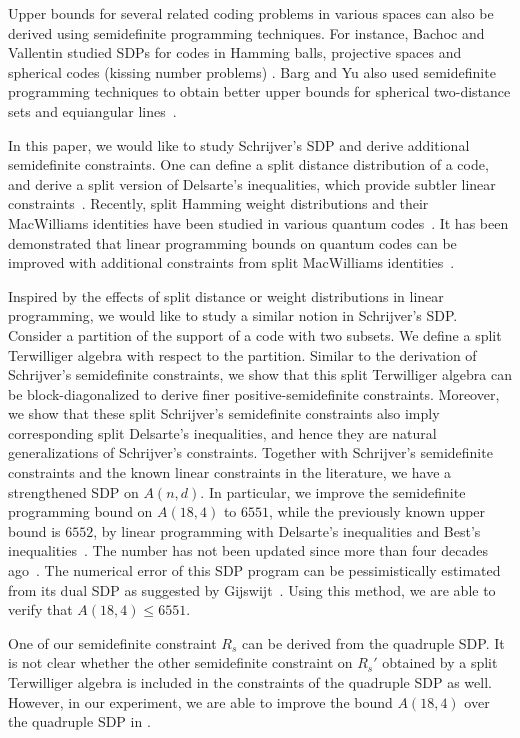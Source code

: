 \documentclass[final,onecolumn]{IEEEtran}
\theoremstyle{definition}
\begin{document}
Upper bounds for several related coding problems in various spaces can also be derived using semidefinite programming techniques. For instance, Bachoc and Vallentin  studied SDPs for codes in Hamming balls, projective spaces and spherical codes (kissing number problems) \cite{Bac10,BV08}. Barg and Yu also used semidefinite programming techniques to obtain better upper bounds for spherical two-distance sets and equiangular lines~\cite{BY13, BY14}.
 
In this paper, we would like to study Schrijver's SDP and derive additional semidefinite constraints. One can define a split distance distribution of a code, and  derive a split version of Delsarte's inequalities, which provide subtler linear constraints~\cite{Sim95}.
Recently, split Hamming weight distributions and their MacWilliams identities have been studied in various quantum codes~\cite{LHL16,LA18,ALB20}. It has been demonstrated that linear programming bounds on quantum codes can be improved with additional constraints from  split MacWilliams identities~\cite{LA18}. 
 
Inspired by the effects of split distance or weight distributions in linear programming, we would like to study a similar notion in Schrijver's SDP. Consider a partition of the support of a code with two subsets. We define a split Terwilliger algebra with respect to the partition. Similar to the derivation of Schrijver's semidefinite constraints, we show that this split Terwilliger algebra can be {block}-diagonalized to derive finer positive-semidefinite constraints. Moreover, we show that these split Schrijver's semidefinite constraints also imply corresponding split Delsarte's inequalities, and hence they are natural generalizations of Schrijver's  constraints. Together with Schrijver's semidefinite constraints and the known linear constraints in the literature, we have a strengthened SDP on $A(n,d)$. In particular, we improve the semidefinite programming bound on $A(18,4)$ to $6551$, while the previously known upper bound is $6552$, by linear programming with Delsarte's inequalities and Best's inequalities~\cite{Bes80}. The number has not been updated since more than four decades ago~\cite{BBMOS_1987,Brouwer}. The numerical error of this SDP program can be pessimistically estimated from its dual SDP as suggested by Gijswijt~\cite{Gij05}. Using this method, we are able to verify that $A(18,4) \leq 6551$.

One of our semidefinite constraint $R_{s}$ can be derived from the quadruple SDP. It is not clear whether the other semidefinite constraint on $R_{s}'$ obtained by a split Terwilliger algebra is included in the constraints of the quadruple SDP as well. However, in our experiment, we are able to improve the bound $A(18,4)$ over the quadruple SDP in \cite{GMS12}.
\end{document}
